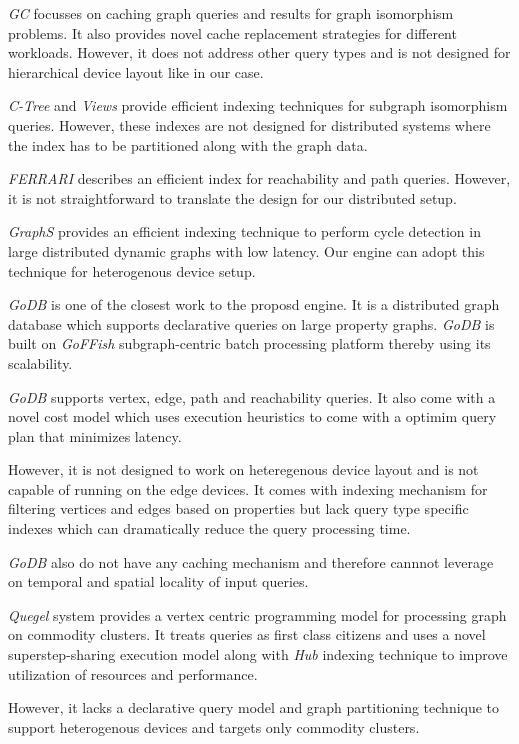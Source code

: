 \documentclass[conference]{IEEEtran}
\begin{document}
\emph{GC} focusses on caching graph queries and results for graph isomorphism problems. It also provides novel cache replacement strategies for different workloads. However, it does not address other query types and is not designed for hierarchical device layout like in our case.

\emph{C-Tree} and \emph{Views} provide efficient indexing techniques for subgraph isomorphism queries. However, these indexes are not designed for distributed systems where the index has to be partitioned along with the graph data.

\emph{FERRARI} describes an efficient index for reachability and path queries. However, it is not straightforward to translate the design for our distributed setup.

\emph{GraphS} provides an efficient indexing technique to perform cycle detection in large distributed dynamic graphs with low latency. Our engine can adopt this technique for heterogenous device setup.  

\emph{GoDB} is one of the closest work to the proposd engine. It is a distributed graph database which supports declarative queries on large property graphs. \emph{GoDB} is built on \emph{GoFFish} subgraph-centric batch processing platform thereby using its scalability.  

\emph{GoDB} supports vertex, edge, path and reachability queries. It also come with a novel cost model which uses execution heuristics to come with a optimim query plan that minimizes latency.

However, it is not designed to work on heteregenous device layout and is not capable of running on the edge devices. It comes with indexing mechanism for filtering vertices and edges based on properties but lack query type specific indexes which can dramatically reduce the query processing time.

\emph{GoDB} also do not have any caching mechanism and therefore cannnot leverage on temporal and spatial locality of input queries. 

\emph{Quegel} system provides a vertex centric programming model for processing graph on commodity clusters. It treats queries as first class citizens and uses a novel superstep-sharing execution model along with \emph{Hub} indexing technique to improve utilization of resources and performance.

However, it lacks a declarative query model and graph partitioning technique to support heterogenous devices and targets only commodity clusters.
\end{document}

